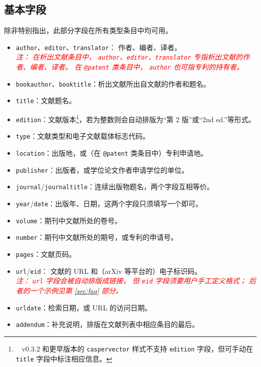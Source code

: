 \documentclass[UTF8]{ctexart}
\newcommand*{\cupercite}[1]{\supercite{#1}\mbox{}}
\newcommand{\myemph}[1]{\emph{\textcolor{red}{#1}}}
\begin{document}
\subsection{基本字段}

除非特别指出，此部分字段在所有类型条目中均可用。

\begin{itemize}
	\item \verb|author|、\verb|editor|、\verb|translator|：
		作者、编者、译者。\\\myemph{%
			注：
			在析出文献条目中，%
			\texttt{author}、\texttt{editor}、\texttt{translator}
			专指析出文献的作者、编者、译者。
			在 \texttt{@patent} 类条目中，%
			\texttt{author} 也可指专利的持有者。%
		}
	\item \verb|bookauthor|、\verb|booktitle|：析出文献所出自文献的作者和题名。
	\item \verb|title|：文献题名。
	\item \verb|edition|：文献版本\footnote{\ %
		v0.3.2 和更早版本的 \texttt{caspervector} 样式不支持 \texttt{edition}
		字段，但可手动在 \texttt{title} 字段中标注相应信息。%
	}，若为整数则会自动排版为“第 2 版”或“2nd ed.”等形式。
	\item \verb|type|：文献类型和电子文献载体标志代码\cupercite{gbt7714-2005}。
	\item \verb|location|：出版地，或（在 \verb|@patent| 类条目中）专利申请地。
	\item \verb|publisher|：出版者，或学位论文作者申请学位的单位。
	\item \verb|journal|/\verb|journaltitle|：连续出版物题名，两个字段互相等价。
	\item \verb|year|/\verb|date|：出版年、日期，这两个字段只须填写一个即可。
	\item \verb|volume|：期刊中文献所处的卷号。
	\item \verb|number|：期刊中文献所处的期号，或专利的申请号。
	\item \verb|pages|：文献页码。
	\item \verb|url|/\verb|eid|：
		文献的 URL 和（arXiv 等平台的）电子标识码。\\\myemph{%
			注：%
			\texttt{url} 字段会被自动排版成链接，
			但 \texttt{eid} 字段须要用户手工定义格式；
			后者的一个示例见第 \ref{sec:faq} 部分。%
		}
	\item \verb|urldate|：检索日期，或 URL 的访问日期。
	\item \verb|addendum|：补充说明，排版在文献列表中相应条目的最后。
\end{itemize}
\end{document}
